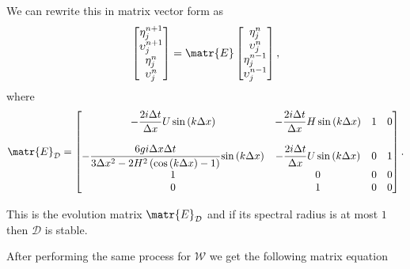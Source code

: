 We can rewrite this in matrix vector form as
\begin{equation}
\begin{bmatrix}
\eta^{n+1}_j \\
\upsilon^{n+1}_j\\
\eta^{n}_j \\
\upsilon^{n}_j
\end{bmatrix} = \matr{E}
\begin{bmatrix}
\eta^{n}_j \\
\upsilon^{n}_j\\
\eta^{n-1}_j \\
\upsilon^{n-1}_j
\end{bmatrix},
\end{equation}
where 
\begin{equation*}
\matr{E}_{\mathcal{D}} = \begin{bmatrix}
-  \dfrac{2 i\Delta t }{\Delta x} U\sin\left(k \Delta x\right)  & -  \dfrac{2 i\Delta t}{\Delta x} H \sin\left(k \Delta x\right)  & 1 &0 \\ \\
-\dfrac{6 gi \Delta x\Delta t}{3 \Delta x^2 -2{H^2} \left( \cos\left(k \Delta x\right) - 1 \right)}{ \sin\left(k \Delta x\right)}  & -\dfrac{2i \Delta t }{\Delta x} U \sin\left(k \Delta x\right)  & 0 &1 \\
1  & 0  &0 &0 \\
0  & 1  &0 &0 
\end{bmatrix} .
\end{equation*}

This is the evolution matrix $\matr{E}_{\mathcal{D}}$ and if its spectral radius is at most $1$ then $\mathcal{D}$ is stable.

After performing the same process for $\mathcal{W}$ we get the following matrix equation

